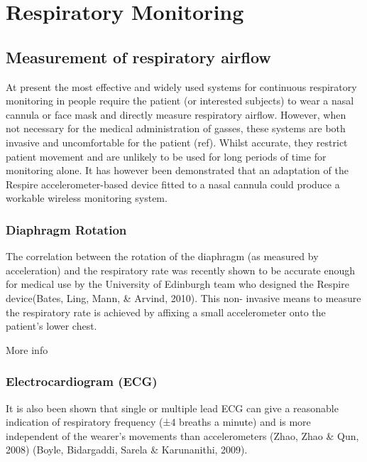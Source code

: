 \section{Respiratory Monitoring}

\subsection{Measurement of respiratory airflow}
At present the most effective and widely used systems for continuous respiratory monitoring in
people require the patient (or interested subjects) to wear a nasal cannula or face mask and directly
measure respiratory airflow. However, when not necessary for the medical administration of gasses,
these systems are both invasive and uncomfortable for the patient (ref). Whilst accurate, they
restrict patient movement and are unlikely to be used for long periods of time for monitoring alone.
It has however been demonstrated that an adaptation of the Respire accelerometer-based device
fitted to a nasal cannula could produce a workable wireless monitoring system.

\subsubsection{Diaphragm Rotation}
The correlation between the rotation of the diaphragm (as measured by acceleration) and the
respiratory rate was recently shown to be accurate enough for medical use by the University of
Edinburgh team who designed the Respire device(Bates, Ling, Mann, & Arvind, 2010). This non-
invasive means to measure the respiratory rate is achieved by affixing a small accelerometer onto
the patient's lower chest.


More info


\subsubsection{Electrocardiogram (ECG)}
It is also been shown that single or multiple lead ECG can give a reasonable indication of respiratory
frequency (±4 breaths a minute) and is more independent of the wearer's movements than
accelerometers (Zhao, Zhao & Qun, 2008) (Boyle, Bidargaddi, Sarela & Karunanithi, 2009).

